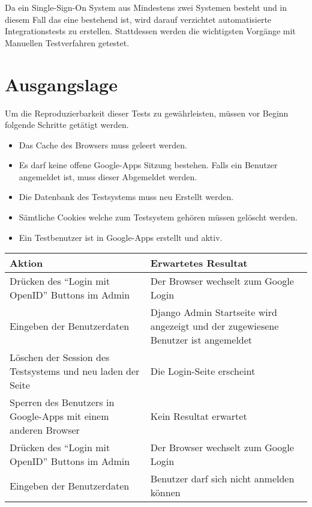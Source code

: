 Da ein Single-Sign-On System aus Mindestens zwei Systemen besteht und in diesem
Fall das eine bestehend ist, wird darauf verzichtet automatisierte
Integrationstests zu erstellen. Stattdessen werden die wichtigsten Vorgänge
mit Manuellen Testverfahren getestet.

\section{Ausgangslage}
\label{sec:Ausgangslage}
Um die Reproduzierbarkeit dieser Tests zu gewährleisten, müssen vor Beginn
folgende Schritte getätigt werden.

\begin{itemize}
    \item Das Cache des Browsers muss geleert werden.
    \item Es darf keine offene Google-Apps Sitzung bestehen. Falls ein Benutzer
          angemeldet ist, muss dieser Abgemeldet werden.
    \item Die Datenbank des Testsystems muss neu Erstellt werden.
    \item Sämtliche Cookies welche zum Testsystem gehören müssen gelöscht
          werden.
    \item Ein Testbenutzer ist in Google-Apps erstellt und aktiv.
\end{itemize}


\begin{tabular}{p{7cm} p{7cm}}
Aktion & Erwartetes Resultat\\
\hline
Drücken des ``Login mit OpenID'' Buttons im Admin & Der Browser wechselt zum Google Login\\
Eingeben der Benutzerdaten & Django Admin Startseite wird angezeigt und der zugewiesene Benutzer ist angemeldet\\
Löschen der Session des Testsystems und neu laden der Seite & Die Login-Seite erscheint\\
Sperren des Benutzers in Google-Apps mit einem anderen Browser & Kein Resultat erwartet\\
Drücken des ``Login mit OpenID'' Buttons im Admin & Der Browser wechselt zum Google Login\\
Eingeben der Benutzerdaten & Benutzer darf sich nicht anmelden können\\
\end{tabular}
